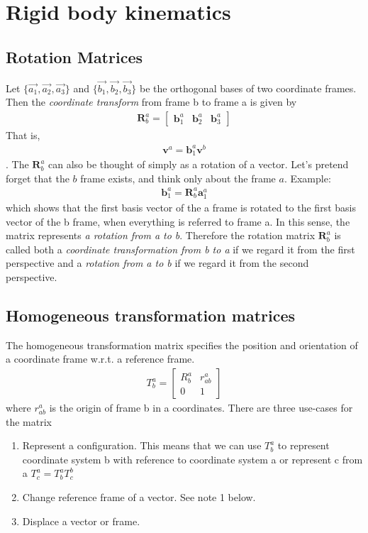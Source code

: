 \section{Rigid body kinematics}
\subsection{Rotation Matrices}
Let $\{\Vec{a_1},\Vec{a_2},\Vec{a_3}\}$ and $\{\Vec{b_1},\Vec{b_2},\Vec{b_3}\}$ be the orthogonal bases of two coordinate frames. Then the \textit{coordinate transform} from frame b to frame a is given by
\begin{align}
    \mathbf{R}_b^a = 
    \begin{bmatrix}
    \mathbf{b}_1^a & \mathbf{b}_2^a & \mathbf{b}_3^a
    \end{bmatrix}
\end{align}
That is,
\begin{align}
    \mathbf{v}^a = \mathbf{b}_1^a\mathbf{v}^b
\end{align}.
The $\mathbf{R}_b^a$ can also be thought of simply as a rotation of a vector. Let's pretend forget that the $b$ frame exists, and think only about the frame $a$. Example:
\begin{align}
    \mathbf{b}_1^a=\mathbf{R}_b^a\mathbf{a}_1^a
\end{align}
which shows that the first basis vector of the a frame is rotated to the first basis vector of the b frame, when everything is referred to frame a. In this sense, the matrix represents \textit{a rotation from a to b}. Therefore the rotation matrix $\mathbf{R}_b^a$ is called both a \textit{coordinate transformation from b to a} if we regard it from the first perspective and a \textit{rotation from a to b} if we regard it from the second perspective.

\subsection{Homogeneous transformation matrices}
The homogeneous transformation matrix specifies the position and orientation of a coordinate frame w.r.t. a reference frame. 
\begin{align}
    T_b^a = 
    \begin{bmatrix}
    R_b^a & r_{ab}^a \\
    0 & 1
    \end{bmatrix}
\end{align}
where $r_{ab}^a$ is the origin of frame b in a coordinates. There are three use-cases for the matrix
\begin{enumerate}
    \item Represent a configuration. This means that we can use $T_b^a$ to represent coordinate system b with reference to coordinate system a or represent c from a $T_c^a=T_b^a T_c^b$
    \item Change reference frame of a vector. See note 1 below.
    \item Displace a vector or frame.
\end{enumerate}

